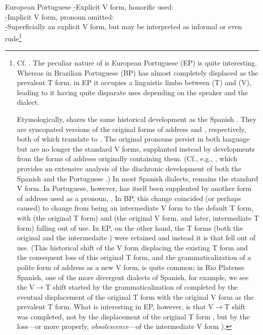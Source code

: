 \pex
	\a European Portuguese
		\beginsubsub
			\b{-}{Explicit V form, honorific used:\\
				 }
			\b{-}{Implicit V form, pronoun omitted:\\
				 }
			\b{-}{Superficially an explicit V form, but may be interpreted as informal or even rude\footnote{
				Cf. \textcite{laraport}. The peculiar nature of  is European Portuguese (EP) is quite interesting. Whereas in Brazilian Portuguese (BP)  has almost completely displaced  as the prevalent T form, in EP it occupies a linguistic limbo between  (T) and  (V), leading to it having quite disparate uses depending on the speaker and the dialect.

				Etymologically,  shares the same historical development as the Spanish . They are syncopated versions of the original forms of address  and , respectively, both of which translate to . The original pronouns  persist in both language but are no longer the standard V forms, supplanted instead by developments from the forms of address originally containing them. (Cf., e.g., \cite{hummelport}, which provides an extensive analysis of the diachronic development of both the Spanish  and the Portuguese .)
				\clearpage
				In most Spanish dialects,  remains the standard V form. In Portuguese, however,  has itself been supplented by another form of address used as a pronoun, . In BP, this change coincided (or perhaps caused)  to change from being an intermediate V form to the default T form, with  (the original T form) and  (the original V form, and later, intermediate T form) falling out of use. In EP, on the other hand, the T forms (both the original  and the intermedaite ) were retained and instead it is  that fell out of use. (This historical shift of the V form displacing the existing T form and the consequent loss of this original T form, and the grammaticalization of a polite form of address as a new V form, is quite common; in Rio Platense Spanish, one of the more divergent dialects of Spanish, for example, we see the V$\rightarrow$T shift started by the grammaticalization of  completed by the eventual displacement of the original T form  with the original V form  as the prevalent T form. What is interesting in EP, however, is that V$\rightarrow$T shift was completed, not by the displacement of the original T form , but by the loss---or more properly, \emph{obsolescence}---of the intermediate V form ).

}}
